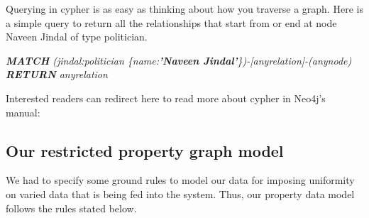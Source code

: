 Querying in cypher is as easy as thinking about how you traverse a graph. Here is a simple query to return all the relationships that start from or end at node Naveen Jindal of type politician.

\emph{ \textbf{MATCH} (jindal:politician \{name:\textbf{'Naveen Jindal'}\})-[anyrelation]-(anynode)
 \textbf{RETURN} anyrelation }

Interested readers can redirect here to read more about cypher in Neo4j's manual\cite{neomanual}: 
\subsection{Our restricted property graph model}

We had to specify some ground rules to model our data for imposing uniformity on varied data that is being fed into the system. Thus, our property data model follows the rules stated below.

